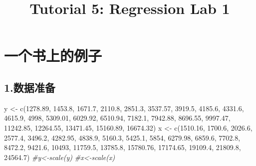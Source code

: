 \documentclass[
]{article}
\title{Tutorial 5: Regression Lab 1}
\author{}
\date{\vspace{-2.5em}}
\newenvironment{Shaded}{\begin{snugshade}}{\end{snugshade}}
\newcommand{\CommentTok}[1]{\textcolor[rgb]{0.56,0.35,0.01}{\textit{#1}}}
\newcommand{\DecValTok}[1]{\textcolor[rgb]{0.00,0.00,0.81}{#1}}
\newcommand{\FloatTok}[1]{\textcolor[rgb]{0.00,0.00,0.81}{#1}}
\newcommand{\FunctionTok}[1]{\textcolor[rgb]{0.00,0.00,0.00}{#1}}
\newcommand{\NormalTok}[1]{#1}
\newcommand{\OtherTok}[1]{\textcolor[rgb]{0.56,0.35,0.01}{#1}}
\begin{document}
\maketitle

\hypertarget{ux4e00ux4e2aux4e66ux4e0aux7684ux4f8bux5b50}{%
\section{一个书上的例子}\label{ux4e00ux4e2aux4e66ux4e0aux7684ux4f8bux5b50}}

\hypertarget{ux6570ux636eux51c6ux5907}{%
\subsection{1.数据准备}\label{ux6570ux636eux51c6ux5907}}

\begin{Shaded}
\begin{Highlighting}[]
\NormalTok{y }\OtherTok{\textless{}{-}} \FunctionTok{c}\NormalTok{(}\FloatTok{1278.89}\NormalTok{, }\FloatTok{1453.8}\NormalTok{, }\FloatTok{1671.7}\NormalTok{, }\FloatTok{2110.8}\NormalTok{, }\FloatTok{2851.3}\NormalTok{, }\FloatTok{3537.57}\NormalTok{, }\FloatTok{3919.5}\NormalTok{, }\FloatTok{4185.6}\NormalTok{, }\FloatTok{4331.6}\NormalTok{, }\FloatTok{4615.9}\NormalTok{, }\DecValTok{4998}\NormalTok{, }\FloatTok{5309.01}\NormalTok{, }\FloatTok{6029.92}\NormalTok{, }\FloatTok{6510.94}\NormalTok{, }\FloatTok{7182.1}\NormalTok{, }\FloatTok{7942.88}\NormalTok{, }\FloatTok{8696.55}\NormalTok{, }\FloatTok{9997.47}\NormalTok{, }\FloatTok{11242.85}\NormalTok{, }\FloatTok{12264.55}\NormalTok{, }\FloatTok{13471.45}\NormalTok{, }\FloatTok{15160.89}\NormalTok{, }\FloatTok{16674.32}\NormalTok{)}
\NormalTok{x }\OtherTok{\textless{}{-}} \FunctionTok{c}\NormalTok{(}\FloatTok{1510.16}\NormalTok{, }\FloatTok{1700.6}\NormalTok{, }\FloatTok{2026.6}\NormalTok{, }\FloatTok{2577.4}\NormalTok{, }\FloatTok{3496.2}\NormalTok{, }\FloatTok{4282.95}\NormalTok{, }\FloatTok{4838.9}\NormalTok{, }\FloatTok{5160.3}\NormalTok{, }\FloatTok{5425.1}\NormalTok{, }\DecValTok{5854}\NormalTok{, }\FloatTok{6279.98}\NormalTok{, }\FloatTok{6859.6}\NormalTok{, }\FloatTok{7702.8}\NormalTok{, }\FloatTok{8472.2}\NormalTok{, }\FloatTok{9421.6}\NormalTok{, }\DecValTok{10493}\NormalTok{, }\FloatTok{11759.5}\NormalTok{, }\FloatTok{13785.8}\NormalTok{, }\FloatTok{15780.76}\NormalTok{, }\FloatTok{17174.65}\NormalTok{, }\FloatTok{19109.4}\NormalTok{, }\FloatTok{21809.8}\NormalTok{, }\FloatTok{24564.7}\NormalTok{)}
\CommentTok{\#y\textless{}{-}scale(y)}
\CommentTok{\#x\textless{}{-}scale(x)}
\end{Highlighting}
\end{Shaded}
\end{document}
